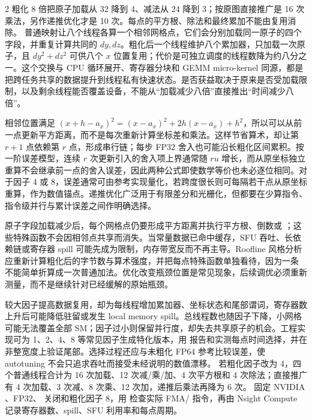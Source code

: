 \begin{solutionexercise}{2}
\conclusionheading 粗化 8 倍把原子加载从 32 降到 4、减法从 24 降到 3；按原图直接推广是
16 次乘法，另作递推优化才是 10 次。每点的平方根、除法和最终累加不能由复用消除。
\discussionheading
{}
普通映射让八个线程各算一个相邻网格点，它们会分别加载同一原子的四个字段，并重复计算共同的 $dy,dz$。粗化后一个线程维护八个累加器，只加载一次原子，且 $dy^2+dz^2$ 可供八个 $x$ 位置复用；代价是可独立调度的线程数降为约八分之一。这个交换与 CPU 循环展开、寄存器分块和 GEMM micro-kernel 同源，都是把跨任务共享的数据提升到线程私有快速状态。是否获益取决于原来是否受加载限制，以及剩余线程能否覆盖设备，不能从“加载减少八倍”直接推出“时间减少八倍”。

相邻位置满足 $(x+h-a_x)^2=(x-a_x)^2+2h(x-a_x)+h^2$，所以可以从前一点更新平方距离，而不是每次重新计算坐标差和乘法。这样节省算术，却让第 $r+1$ 点依赖第 $r$ 点，形成串行链；每步 FP32 舍入也可能沿长粗化区间累积。按一阶误差模型，连续 $r$ 次更新引入的舍入项上界通常随 $r u$ 增长，而从原坐标独立重算不会继承前一点的舍入误差，因此两种公式即使数学等价也未必逐位相同。对于因子 4 或 8，误差通常可由参考实现量化，若跨度很长则可每隔若干点从原坐标重算，作为数值锚点。递推优化广泛用于有限差分和光栅化，但都要在少算指令、指令级并行与累计误差之间作明确选择。

原子字段加载减少后，每个网格点仍要形成平方距离并执行平方根、倒数或 ；这些特殊函数不会因相邻点共享而消失。当常量数据已命中缓存，SFU 吞吐、长依赖链或寄存器 spill 可能先成为限制，内存带宽反而不再主导。Roofline 风格分析应重新计算粗化后的字节数与算术强度，并把每点特殊函数单独看待，因为一条  不能简单折算成一次普通加法。优化改变瓶颈位置是常见现象，后续调优必须重新测量，而不是继续针对已经缓解的原始瓶颈。

较大因子提高数据复用，却为每线程增加累加器、坐标状态和尾部谓词，寄存器数上升后可能降低驻留或发生 local memory spill。总线程数也随因子下降，小网格可能无法覆盖全部 SM；因子过小则保留并行度，却失去共享原子的机会。工程实现可为 1、2、4、8 等常见因子生成特化版本，用  报告和实测每点时间选择，并在非整宽度上验证尾部。选择过程还应与未粗化 FP64 参考比较误差，使 autotuning 不会只追求吞吐而接受未经说明的数值漂移。
\variantheading 若粗化因子改为 4，四个普通线程合计为 16 次加载、12 次减/乘/加、4 次平方根和 4 次除法；直接推广有 4 次加载、3 次减、8 次乘、12 次加，递推后乘法再降为 6 次。
\practiceheading 固定 NVIDIA 、FP32、 关闭和粗化因子 8，用  检查实际 FMA/ 指令，再由 Nsight Compute 记录寄存器数、spill、SFU 利用率和每点周期。
\end{solutionexercise}

